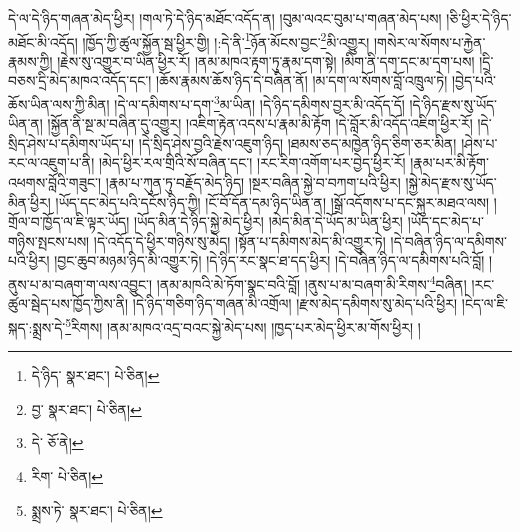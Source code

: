 དེ་ལ་དེ་ཉིད་གཞན་མེད་ཕྱིར། །གལ་ཏེ་དེ་ཉིད་མཐོང་འདོད་ན། །བུམ་ལའང་བུམ་པ་གཞན་མེད་པས། །ཅི་ཕྱིར་དེ་ཉིད་མཐོང་མི་འདོད། །ཁྱོད་ཀྱི་ཚུལ་སྐྱོན་སྦ་ཕྱིར་གྱི། །:དེ་ནི་\footnote{དེ་ཉིད་  སྣར་ཐང་།  པེ་ཅིན། }ཉོན་མོངས་བྱང་\footnote{བྱ་  སྣར་ཐང་།  པེ་ཅིན། }མི་འགྱུར། །གསེར་ལ་སོགས་པ་རྐྱེན་རྣམས་ཀྱི། །རྗེས་སུ་འགྱུར་བ་ཡིན་ཕྱིར་རོ། །ནམ་མཁའ་རྟག་ཏུ་རྣམ་དག་སྟེ། །མིག་ནི་དག་དང་མ་དག་པས། །དྲི་བཅས་དྲི་མེད་མཁའ་འདོད་དང་། །ཆོས་རྣམས་ཆོས་ཉིད་དེ་བཞིན་ནོ། །མ་དག་ལ་སོགས་བློ་འཁྲུལ་ཏེ། །བྱེད་པའི་ཆོས་ཡིན་ལས་ཀྱི་མིན། །དེ་ལ་དམིགས་པ་དག་\footnote{དེ་  ཅོ་ནེ། }མ་ཡིན། །དེ་ཉིད་དམིགས་བྱར་མི་འདོད་དོ། །དེ་ཉིད་རྫས་སུ་ཡོད་ཡིན་ན། །སྐྱོན་ནི་སྔ་མ་བཞིན་དུ་འགྱུར། །འཇིག་རྟེན་འདས་པ་རྣམ་མི་རྟོག །དེ་བློར་མི་འདོད་འཇིག་ཕྱིར་རོ། །དེ་སྲིད་ཤེས་པ་དམིགས་ཡོད་པ། །དེ་སྲིད་ཤེས་བྱའི་རྗེས་འཇུག་ཉིད། །ཐམས་ཅད་མཁྱེན་ཉིད་ཅིག་ཅར་མིན། །ཤེས་པ་རང་ལ་འཇུག་པ་ནི། །མེད་ཕྱིར་རལ་གྲིའི་སོ་བཞིན་དང་། །རང་རིག་འགོག་པར་བྱེད་ཕྱིར་རོ། །རྣམ་པར་མི་རྟོག་འཕགས་བློའི་གཟུང་། །རྣམ་པ་ཀུན་ཏུ་བརྗོད་མེད་ཉིད། །སྔར་བཞིན་སྐྱེ་བ་བཀག་པའི་ཕྱིར། །སྐྱེ་མེད་རྫས་སུ་ཡོད་མིན་ཕྱིར། །ཡོད་དང་མེད་པའི་དངོས་ཉིད་ཀྱི། །ངོ་བོ་དོན་དམ་ཉིད་ཡིན་ན། །སྒྲོ་འདོགས་པ་དང་སྐུར་མཐའ་ལས། །གྲོལ་བ་ཁྱོད་ལ་ཇི་ལྟར་ཡོད། །ཡོད་མིན་དེ་ཉིད་སྐྱེ་མེད་ཕྱིར། །མེད་མིན་དེ་ཡོད་མ་ཡིན་ཕྱིར། །ཡོད་དང་མེད་པ་གཉིས་སྤངས་པས། །དེ་འདོད་དེ་ཕྱིར་གཉིས་སུ་མེད། །སྟོན་པ་དམིགས་མེད་མི་འགྱུར་ཏེ། །དེ་བཞིན་ཉིད་ལ་དམིགས་པའི་ཕྱིར། །བྱང་ཆུབ་མཉམ་ཉིད་མི་འགྱུར་ཏེ། །དེ་ཉིད་རང་སྣང་ཐ་དད་ཕྱིར། །དེ་བཞིན་ཉིད་ལ་དམིགས་པའི་བློ། །ནུས་པ་མ་བཞག་ག་ལས་འབྱུང་། །ནམ་མཁའི་མེ་ཏོག་སྣང་བའི་བློ། །ནུས་པ་མ་བཞག་མི་རིགས་\footnote{རིག་  པེ་ཅིན། }བཞིན། །རང་ཚུལ་སྦེད་པས་ཁྱོད་ཀྱིས་ནི། །དེ་ཉིད་གཅིག་ཉིད་གཞན་མི་འགྲོལ། །རྫས་མེད་དམིགས་སུ་མེད་པའི་ཕྱིར། །ངེད་ལ་ཇི་སྐད་:སྨྲས་དེ་\footnote{སྨྲས་ཏེ་  སྣར་ཐང་།  པེ་ཅིན། }རིགས། །ནམ་མཁའ་འདྲ་བའང་སྐྱེ་མེད་པས། །ཁྱད་པར་མེད་ཕྱིར་མ་གོས་ཕྱིར། །
